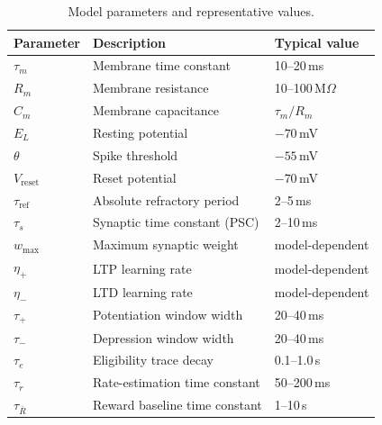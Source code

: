 \documentclass[11pt]{article}
\theoremstyle{definition}
\begin{document}
\begin{table}[ht]
\centering
\caption{Model parameters and representative values.}
\label{tab:parameters}
\begin{tabular}{@{}lll@{}}
\toprule
Parameter & Description & Typical value \\
\midrule
$\tau_m$            & Membrane time constant         & 10--20\,ms       \\
$R_m$               & Membrane resistance            & 10--100\,M$\Omega$ \\
$C_m$               & Membrane capacitance           & $\tau_m / R_m$   \\
$E_L$               & Resting potential              & $-70$\,mV        \\
$\theta$            & Spike threshold                & $-55$\,mV        \\
$V_{\mathrm{reset}}$ & Reset potential               & $-70$\,mV        \\
$\tau_{\mathrm{ref}}$ & Absolute refractory period   & 2--5\,ms         \\
$\tau_s$            & Synaptic time constant (PSC)   & 2--10\,ms        \\
$w_{\mathrm{max}}$  & Maximum synaptic weight        & model-dependent  \\
$\eta_+$            & LTP learning rate              & model-dependent  \\
$\eta_-$            & LTD learning rate              & model-dependent  \\
$\tau_+$            & Potentiation window width      & 20--40\,ms       \\
$\tau_-$            & Depression window width         & 20--40\,ms       \\
$\tau_e$            & Eligibility trace decay        & 0.1--1.0\,s      \\
$\tau_r$            & Rate-estimation time constant   & 50--200\,ms      \\
$\tau_{\bar{R}}$    & Reward baseline time constant   & 1--10\,s         \\
\bottomrule
\end{tabular}
\end{table}


\end{document}
